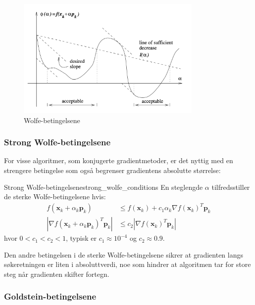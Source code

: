 \begin{figure}[H]
	\centering
	\includegraphics[width=0.8\textwidth]{figures/wolfe_conditions.png}
	\caption{Wolfe-betingelsene}
	\label{fig:wolfe_conditions}
\end{figure}

\subsubsection{Strong Wolfe-betingelsene}
\label{subsubsec:strong_wolfe_conditions}
For visse algoritmer, som konjugerte gradientmetoder, er det nyttig med en strengere betingelse som også begrenser gradientens absolutte størrelse:

\begin{definition}{Strong Wolfe-betingelsene}{strong_wolfe_conditions}
	En steglengde \(\alpha\) tilfredsstiller de sterke Wolfe-betingelsene hvis:
	\begin{align}
		f(\symbf{x}_k + \alpha_k\symbf{p}_k)                       & \leq f(\symbf{x}_k) + c_1\alpha_k\nabla f(\symbf{x}_k)^T\symbf{p}_k \\
		|\nabla f(\symbf{x}_k + \alpha_k\symbf{p}_k)^T\symbf{p}_k| & \leq c_2|\nabla f(\symbf{x}_k)^T\symbf{p}_k|
	\end{align}
	hvor \(0 < c_1 < c_2 < 1\), typisk er $c_1 \approx 10^{-4}$ og $c_2 \approx 0.9$.
\end{definition}

Den andre betingelsen i de sterke Wolfe-betingelsene sikrer at gradienten langs søkeretningen er liten i absoluttverdi, noe som hindrer at algoritmen tar for store steg når gradienten skifter fortegn.

\subsubsection{Goldstein-betingelsene}
\label{subsubsec:goldstein_conditions}

